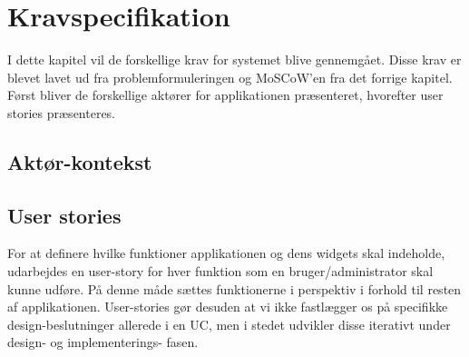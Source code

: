 \chapter{Kravspecifikation}
I dette kapitel vil de forskellige krav for systemet blive gennemgået. Disse krav er blevet lavet ud fra problemformuleringen og MoSCoW'en fra det forrige kapitel. Først bliver de forskellige aktører for applikationen præsenteret, hvorefter user stories præsenteres.
\section{Aktør-kontekst}


\section{User stories}
For at definere hvilke funktioner applikationen og dens widgets skal indeholde, udarbejdes en user-story for hver funktion som en bruger/administrator skal kunne udføre. På denne måde sættes funktionerne i perspektiv i forhold til resten af applikationen. User-stories gør desuden at vi ikke fastlægger os på specifikke design-beslutninger allerede i en UC, men i stedet udvikler disse iterativt under design- og implementerings- fasen. 
